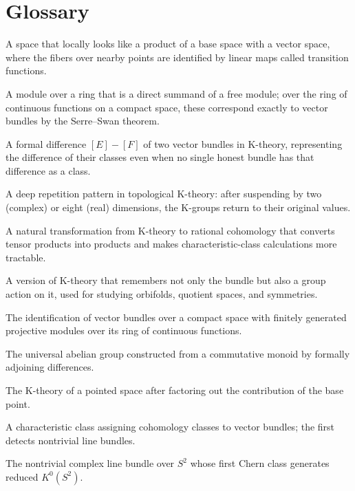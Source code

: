 \section*{Glossary}
\begin{description}[leftmargin=*,style=nextline,itemsep=0.3em]
\item[\textbf{Vector bundle.}] A space that locally looks like a product of a base space with a vector space, where the fibers over nearby points are identified by linear maps called transition functions.
\item[\textbf{Projective module.}] A module over a ring that is a direct summand of a free module; over the ring of continuous functions on a compact space, these correspond exactly to vector bundles by the Serre--Swan theorem.
\item[\textbf{Virtual bundle.}] A formal difference $[E]-[F]$ of two vector bundles in K-theory, representing the difference of their classes even when no single honest bundle has that difference as a class.
\item[\textbf{Bott periodicity.}] A deep repetition pattern in topological K-theory: after suspending by two (complex) or eight (real) dimensions, the K-groups return to their original values.
\item[\textbf{Chern character.}] A natural transformation from K-theory to rational cohomology that converts tensor products into products and makes characteristic-class calculations more tractable.
\item[\textbf{Equivariant K-theory.}] A version of K-theory that remembers not only the bundle but also a group action on it, used for studying orbifolds, quotient spaces, and symmetries.
\item[\textbf{Serre--Swan theorem.}] The identification of vector bundles over a compact space with finitely generated projective modules over its ring of continuous functions.
\item[\textbf{Grothendieck group.}] The universal abelian group constructed from a commutative monoid by formally adjoining differences.
\item[\textbf{Reduced K-theory.}] The K-theory of a pointed space after factoring out the contribution of the base point.
\item[\textbf{Chern class.}] A characteristic class assigning cohomology classes to vector bundles; the first detects nontrivial line bundles.
\item[\textbf{Hopf bundle.}] The nontrivial complex line bundle over $S^2$ whose first Chern class generates reduced $K^0(S^2)$.
\end{description}

